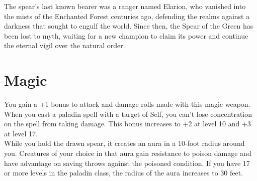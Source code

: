 The spear's last known bearer was a ranger named Elarion, who vanished into the mists of the Enchanted Forest centuries ago, defending the realms against a darkness that sought to engulf the world. Since then, the Spear of the Green has been lost to myth, waiting for a new champion to claim its power and continue the eternal vigil over the natural order.

\section*{Magic}
You gain a +1 bonus to attack and damage rolls made with this magic weapon. When you cast a paladin spell with a target of Self, you can't lose concentration on the spell from taking damage. This bonus increases to +2 at level 10 and +3 at level 17.\\
While you hold the drawn spear, it creates an aura in a 10-foot radius around you. Creatures of your choice in that aura gain resistance to poison damage and have advantage on saving throws against the poisoned condition. If you have 17 or more levels in the paladin class, the radius of the aura increases to 30 feet.